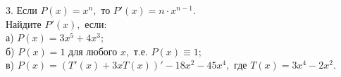 3. Если $P(x)=x^n,$ то $P'(x)=n\cdot x^{n-1}.$\\
Найдите $P'(x),$ если:\\
а) $P(x)=3x^5+4x^3;$\\
б) $P(x)=1$ для любого $x,$ т.е. $P(x)\equiv 1;$\\
в) $P(x)=(T'(x)+3xT(x))'-18x^2-45x^4,$ где $T(x)=3x^4-2x^2.$\\
